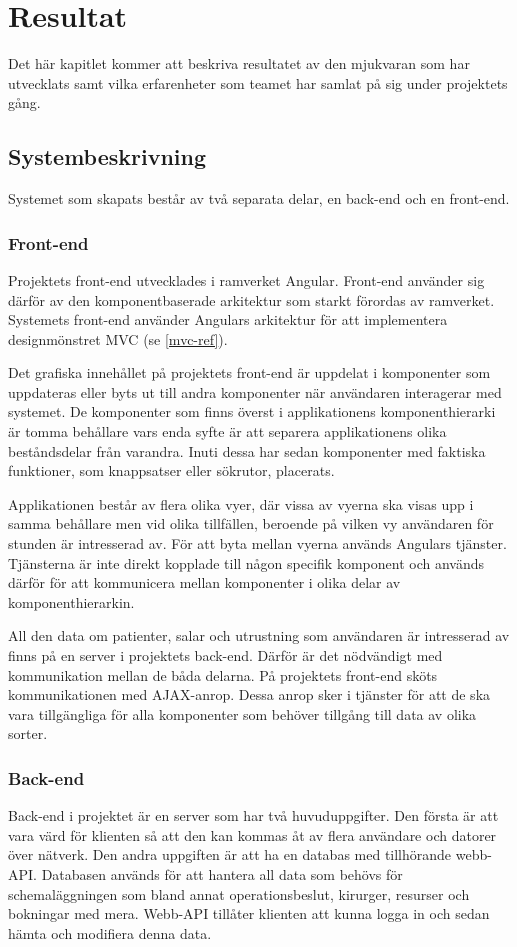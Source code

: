 \chapter{Resultat}
Det här kapitlet kommer att beskriva resultatet av den mjukvaran som har utvecklats samt vilka erfarenheter som
teamet har samlat på sig under projektets gång.

\section{Systembeskrivning}
Systemet som skapats består av två separata delar, en back-end och en front-end.

\subsection{Front-end}
Projektets front-end utvecklades i ramverket Angular. Front-end använder sig därför av den komponentbaserade arkitektur som starkt förordas av ramverket. Systemets front-end använder Angulars arkitektur för att implementera designmönstret MVC (se \ref{mvc-ref}).

Det grafiska innehållet på projektets front-end är uppdelat i komponenter som uppdateras eller byts ut till andra komponenter när användaren interagerar med systemet. De komponenter som finns överst i applikationens komponenthierarki är tomma behållare vars enda syfte är att separera applikationens olika beståndsdelar från varandra. Inuti dessa har sedan komponenter med faktiska funktioner, som knappsatser eller sökrutor, placerats.

Applikationen består av flera olika vyer, där vissa av vyerna ska visas upp i samma behållare men vid olika tillfällen, beroende på vilken vy användaren för stunden är intresserad av. För att byta mellan vyerna används Angulars tjänster. Tjänsterna är inte direkt kopplade till någon specifik komponent och används därför för att kommunicera mellan komponenter i olika delar av komponenthierarkin.

All den data om patienter, salar och utrustning som användaren är intresserad av finns på en server i projektets back-end. Därför är det nödvändigt med kommunikation mellan de båda delarna. På projektets front-end sköts kommunikationen med AJAX-anrop. Dessa anrop sker i tjänster för att de ska vara tillgängliga för alla komponenter som behöver tillgång till data av olika sorter.

\subsection{Back-end}
Back-end i projektet är en server som har två huvuduppgifter. Den första är att vara värd för klienten så att den kan kommas åt av flera användare och datorer över nätverk. Den andra uppgiften är att ha en databas med tillhörande webb-API. Databasen används för att hantera all data som behövs för schemaläggningen som bland annat operationsbeslut, kirurger, resurser och bokningar med mera. Webb-API tillåter klienten att kunna logga in och sedan hämta och modifiera denna data.

